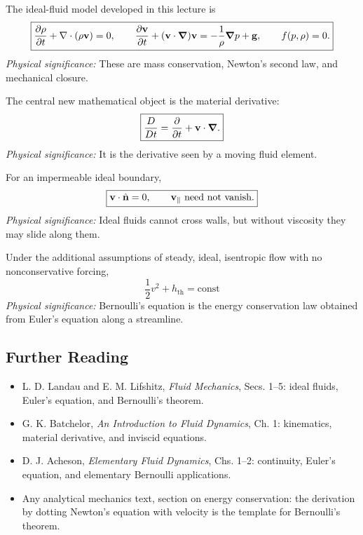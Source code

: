 \documentclass[../main.tex]{subfiles}
\begin{document}
The ideal-fluid model developed in this lecture is
\begin{equation}
  \boxed{
  \pdv{\rho}{t}+\nabla \cdot(\rho\mathbf{v})=0,\qquad
  \pdv{\mathbf{v}}{t}+(\mathbf{v}\cdot\grad)\mathbf{v}
  =
  -\frac{1}{\rho}\grad p+\mathbf{g},\qquad
  f(p,\rho)=0.}
  \label{eq:lec12_summary_ideal_system}
\end{equation}
\textit{Physical significance:} These are mass conservation, Newton's second law, and mechanical closure.

The central new mathematical object is the material derivative:
\begin{equation}
  \boxed{\frac{D}{Dt}=\pdv{}{t}+\mathbf{v}\cdot\grad.}
  \label{eq:lec12_summary_material_derivative}
\end{equation}
\textit{Physical significance:} It is the derivative seen by a moving fluid element.

For an impermeable ideal boundary,
\begin{equation}
  \boxed{\vel\cdot\uvec{n}=0,\qquad \vel_\parallel\ \text{need not vanish}.}
  \label{eq:lec12_summary_boundary}
\end{equation}
\textit{Physical significance:} Ideal fluids cannot cross walls, but without viscosity they may slide along them.

Under the additional assumptions of steady, ideal, isentropic flow with no nonconservative forcing,
\begin{equation}
  \boxed{\frac{1}{2}v^2+h_{\mathrm{th}}=\mathrm{const}}
  \label{eq:lec12_summary_bernoulli}
\end{equation}
\textit{Physical significance:} Bernoulli's equation is the energy conservation law obtained from Euler's equation along a streamline.

\subsection*{Further Reading}
\begin{itemize}
  \item L. D. Landau and E. M. Lifshitz, \textit{Fluid Mechanics}, Secs. 1--5: ideal fluids, Euler's equation, and Bernoulli's theorem.
  \item G. K. Batchelor, \textit{An Introduction to Fluid Dynamics}, Ch. 1: kinematics, material derivative, and inviscid equations.
  \item D. J. Acheson, \textit{Elementary Fluid Dynamics}, Chs. 1--2: continuity, Euler's equation, and elementary Bernoulli applications.
  \item Any analytical mechanics text, section on energy conservation: the derivation by dotting Newton's equation with velocity is the template for Bernoulli's theorem.
\end{itemize}
\end{document}
